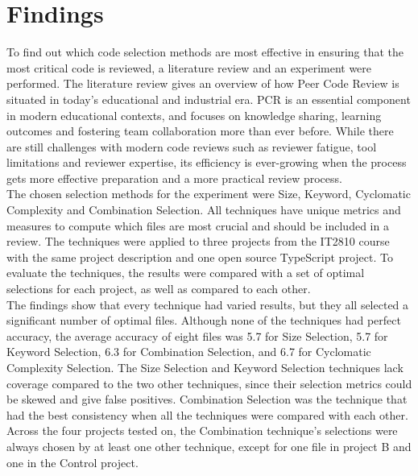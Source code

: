 \section{Findings}
To find out which code selection methods are most effective in ensuring that the most critical code is reviewed, a literature review and an experiment were performed. The literature review gives an overview of how Peer Code Review is situated in today's educational and industrial era. PCR is an essential component in modern educational contexts, and focuses on knowledge sharing, learning outcomes and fostering team collaboration more than ever before. While there are still challenges with modern code reviews such as reviewer fatigue, tool limitations and reviewer expertise, its efficiency is ever-growing when the process gets more effective preparation and a more practical review process. \\

The chosen selection methods for the experiment were Size, Keyword, Cyclomatic Complexity and Combination Selection. All techniques have unique metrics and measures to compute which files are most crucial and should be included in a review. The techniques were applied to three projects from the IT2810 course with the same project description and one open source TypeScript project. To evaluate the techniques, the results were compared with a set of optimal selections for each project, as well as compared to each other. \\

The findings show that every technique had varied results, but they all selected a significant number of optimal files. Although none of the techniques had perfect accuracy, the average accuracy of eight files was 5.7 for Size Selection, 5.7 for Keyword Selection, 6.3 for Combination Selection, and 6.7 for Cyclomatic Complexity Selection. The Size Selection and Keyword Selection techniques lack coverage compared to the two other techniques, since their selection metrics could be skewed and give false positives. Combination Selection was the technique that had the best consistency when all the techniques were compared with each other. Across the four projects tested on, the Combination technique's selections were always chosen by at least one other technique, except for one file in project B and one in the Control project. \\

